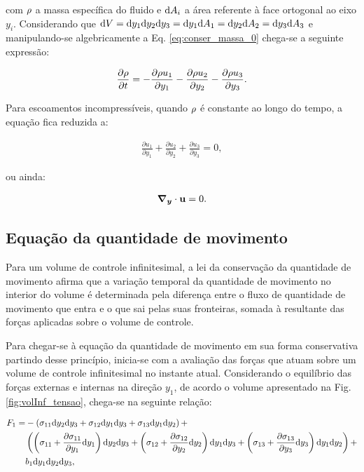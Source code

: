 \documentclass[tese_patricia]{subfiles}%
\begin{document}
\noindent com $\rho$ a massa específica do fluido e $\mathrm{d} A_{i}$ a área referente à face ortogonal ao eixo $y_i$. Considerando que $\mathrm{d} V = \mathrm{d} y_1 \mathrm{d} y_2 \mathrm{d} y_3 = \mathrm{d} y_1 \mathrm{d} A_1 = \mathrm{d} y_2 \mathrm{d} A_2 = \mathrm{d} y_3 \mathrm{d} A_3 $  e manipulando-se algebricamente a Eq. \ref{eq:conser_massa_0} chega-se a seguinte expressão:

\begin{align}
	\frac{\partial \rho}{\partial t} = - \frac{\partial \rho u_{1}}{\partial y_1} - \frac{\partial \rho u_{2}}{\partial y_2}- \frac{\partial \rho u_{3}}{\partial y_3}.
\end{align}

Para escoamentos incompressíveis, quando $\rho$ é constante ao longo do tempo, a equação fica reduzida a:

\begin{align}
	 \frac{\partial u_{1}}{\partial y_1} + \frac{\partial u_{2}}{\partial y_2} + \frac{\partial u_{3}}{\partial y_3} = 0, 
\end{align} 

\noindent ou ainda:

\begin{align}
	\boldsymbol{\nabla_y} \cdot \mathbf{u} = 0.
	\label{eq:conser_massa_incom} 
\end{align} 

\subsection{Equação da quantidade de movimento}


Para um volume de controle infinitesimal, a lei da conservação da quantidade de movimento afirma que a variação temporal da quantidade de movimento no interior do volume é determinada pela diferença entre o fluxo de quantidade de movimento que entra e o que sai pelas suas fronteiras, somada à resultante das forças aplicadas sobre o volume de controle.

Para chegar-se à equação da quantidade de movimento em sua forma conservativa partindo desse princípio, inicia-se com a avaliação das forças que atuam sobre um volume de controle infinitesimal no instante atual. Considerando o equilíbrio das forças externas e internas na direção $y_1$, de acordo o volume apresentado na Fig. \ref{fig:volInf_tensao}, chega-se na seguinte relação:


\begin{align}
	\begin{split}
	F_1 =& -\left(\sigma_{11}\mathrm{d} y_2 \mathrm{d} y_3 + \sigma_{12}\mathrm{d} y_1 \mathrm{d} y_3 + \sigma_{13}\mathrm{d} y_1 \mathrm{d} y_2\right) + \\ & \left(\left(\sigma_{11} + \frac{\partial \sigma_{11}}{\partial y_1}\mathrm{d} y_1 \right)\mathrm{d} y_2 \mathrm{d} y_3 + \left(\sigma_{12}+ \frac{\partial \sigma_{12}}{\partial y_2}\mathrm{d} y_2\right)\mathrm{d} y_1 \mathrm{d} y_3 + \left(\sigma_{13}+ \frac{\partial \sigma_{13}}{\partial y_3}\mathrm{d} y_3\right)\mathrm{d} y_1 \mathrm{d} y_2\right) + \\& b_{1}\mathrm{d} y_1 \mathrm{d} y_2 \mathrm{d} y_3, \label{eq:equil_forca_y1} 
	\end{split}
\end{align}	
\end{document}
